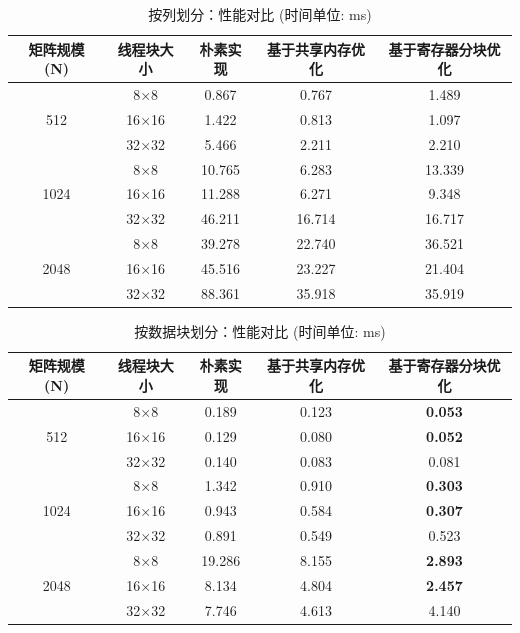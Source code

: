 \documentclass{SYSUReport}
\begin{document}
\begin{table}[H]
\centering
\caption{按列划分：性能对比 (时间单位: ms)}
\label{tab:perf_col}
\begin{tabular}{|c|c|c|c|c|}
\hline
矩阵规模 (N) & 线程块大小 & 朴素实现 & 基于共享内存优化 & 基于寄存器分块优化 \\
\hline
\multirow{3}{*}{512} & 8$\times$8 & 0.867 & 0.767 & 1.489 \\
\cline{2-5}
& 16$\times$16 & 1.422 & 0.813 & 1.097 \\
\cline{2-5}
& 32$\times$32 & 5.466 & 2.211 & 2.210 \\
\hline
\multirow{3}{*}{1024} & 8$\times$8 & 10.765 & 6.283 & 13.339 \\
\cline{2-5}
& 16$\times$16 & 11.288 & 6.271 & 9.348 \\
\cline{2-5}
& 32$\times$32 & 46.211 & 16.714 & 16.717 \\
\hline
\multirow{3}{*}{2048} & 8$\times$8 & 39.278 & 22.740 & 36.521 \\
\cline{2-5}
& 16$\times$16 & 45.516 & 23.227 & 21.404 \\
\cline{2-5}
& 32$\times$32 & 88.361 & 35.918 & 35.919 \\
\hline
\end{tabular}
\end{table}

\begin{table}[H]
\centering
\caption{按数据块划分：性能对比 (时间单位: ms)}
\label{tab:perf_block}
\begin{tabular}{|c|c|c|c|c|}
\hline
矩阵规模 (N) & 线程块大小 & 朴素实现 & 基于共享内存优化 & 基于寄存器分块优化 \\
\hline
\multirow{3}{*}{512} & 8$\times$8 & 0.189 & 0.123 & \textbf{0.053} \\
\cline{2-5}
& 16$\times$16 & 0.129 & 0.080 & \textbf{0.052} \\
\cline{2-5}
& 32$\times$32 & 0.140 & 0.083 & 0.081 \\
\hline
\multirow{3}{*}{1024} & 8$\times$8 & 1.342 & 0.910 & \textbf{0.303} \\
\cline{2-5}
& 16$\times$16 & 0.943 & 0.584 & \textbf{0.307} \\
\cline{2-5}
& 32$\times$32 & 0.891 & 0.549 & 0.523 \\
\hline
\multirow{3}{*}{2048} & 8$\times$8 & 19.286 & 8.155 & \textbf{2.893} \\
\cline{2-5}
& 16$\times$16 & 8.134 & 4.804 & \textbf{2.457} \\
\cline{2-5}
& 32$\times$32 & 7.746 & 4.613 & 4.140 \\
\hline
\end{tabular}
\end{table}
\end{document}
